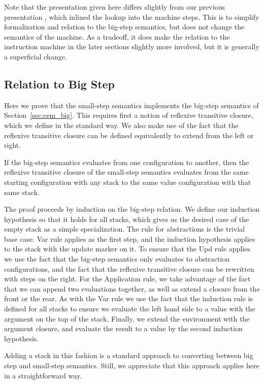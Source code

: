 Note that the presentation given here differs slightly from our previous
presentation \cite{cem}, which inlined the lookup into the machine steps. This
is to simplify formalization and relation to the big-step semantics, but does not
change the semantics of the machine. As a tradeoff, it does make the relation to
the instruction machine in the later sections slightly more involved, but
it is generally a superficial change.

\subsection{Relation to Big Step}
Here we prove that the small-step semantics implements the big-step semantics of
Section~\ref{sec:cem_big}. This requires first a notion of reflexive transitive closure,
which we define in the standard way. We also make use of the fact that the
reflexive transitive closure can be defined equivalently to extend from the left
or right. 

\begin{lemma}
If the big-step semantics evaluates from one configuration to another, then the
reflexive transitive closure of the small-step semantics evaluates from the same
starting configuration with any stack to the same value configuration with that
same stack.
\end{lemma}
\begin{proofoutline}
The proof proceeds by induction on the big-step relation. We define our
induction hypothesis so that it holds for all stacks, which gives us the
desired case of the empty stack as a simple specialization. The rule for
abstractions is the trivial base case. Var rule applies as the first step, and
the induction hypothesis applies to the stack with the update marker on it. To
ensure that the Upd rule applies we use the fact that the big-step semantics
only evaluates to abstraction configurations, and the fact that the reflexive
transitive closure can be rewritten with steps on the right. For the Application
rule, we take advantage of the fact that we can append two evaluations together,
as well as extend a closure from the front or the rear. As with the Var rule we
use the fact that the induction rule is defined for all stacks to ensure we
evaluate the left hand side to a value with the argument on the top of the
stack.  Finally, we extend the environment with the argument closure, and
evaluate the result to a value by the second induction hypothesis.
\end{proofoutline}

Adding a stack in this fashion is a standard approach to converting between big
step and small-step semantics. Still, we appreciate that this approach applies
here in a straightforward way. 
